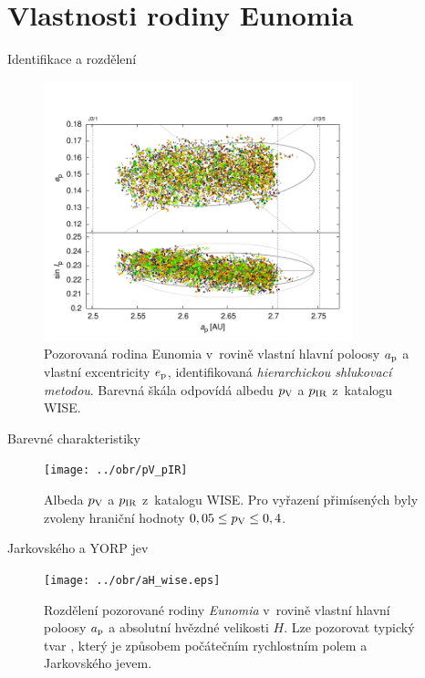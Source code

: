 \documentclass[xcolor=dvipsnames]{beamer}
\begin{document}
\section{Vlastnosti rodiny Eunomia}
\begin{frame}[t]{\secname}{Identifikace a rozdělení}
\vspace{-1cm}
\begin{figure}
\centering
\includegraphics[width=0.8\textwidth]{../obr/ae_ai_wise}
\caption{\footnotesize{Pozorovaná rodina Eunomia v~rovině vlastní hlavní poloosy $a_{\rm p}$ a vlastní excentricity $e_{\rm p}$, identifikovaná \textit{hierarchickou shlukovací metodou}. Barevná škála odpovídá albedu $p_{\rm V}$ a $p_{\rm IR}$ z~katalogu WISE\@.}}
\end{figure}
\end{frame}

\begin{frame}[t]{\secname}{Barevné charakteristiky}
\begin{figure}
\centering
\texttt{[image: ../obr/pV\_pIR]}
\caption{\footnotesize{Albeda $p_{\rm V}$ a $p_{\rm IR}$ z~katalogu WISE. Pro vyřazení přimísených byly zvoleny hraniční hodnoty $0,05 \leq p_{\rm V} \leq 0,4$.}}
\end{figure}
\end{frame}

\begin{frame}[t]{\secname}{Jarkovského a YORP jev}
\begin{figure}
\centering
\texttt{[image: ../obr/aH\_wise.eps]}
\caption{\footnotesize{Rozdělení pozorované rodiny \textit{Eunomia} v~rovině vlastní hlavní poloosy $a_{\rm p}$ a absolutní hvězdné velikosti $H$. Lze pozorovat typický tvar , který je způsobem počátečním rychlostním polem a Jarkovského jevem.}}
\end{figure}
\end{frame}
\end{document}

